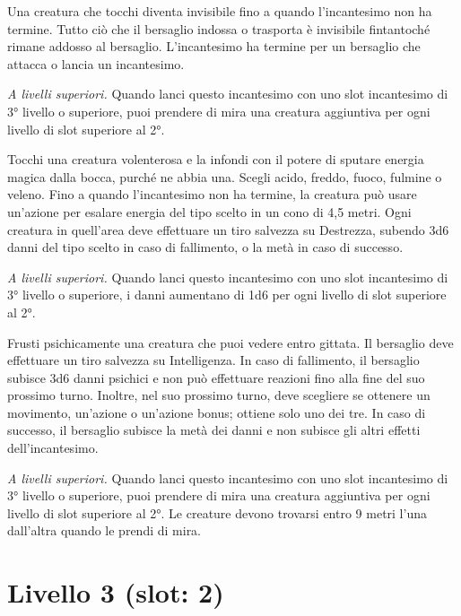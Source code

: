 \documentclass[letterpaper,twocolumn,openany,nodeprecatedcode,justified]{dndbook}
\begin{document}
Una creatura che tocchi diventa invisibile fino a quando l'incantesimo non ha termine. Tutto ciò che il bersaglio indossa o trasporta è invisibile fintantoché rimane addosso al bersaglio. L'incantesimo ha termine per un bersaglio che attacca o lancia un incantesimo.

\emph{A livelli superiori.} Quando lanci questo incantesimo con uno slot incantesimo di 3° livello o superiore, puoi prendere di mira una creatura aggiuntiva per ogni livello di slot superiore al 2°.


Tocchi una creatura volenterosa e la infondi con il potere di sputare energia magica dalla bocca, purché ne abbia una. Scegli acido, freddo, fuoco, fulmine o veleno. Fino a quando l'incantesimo non ha termine, la creatura può usare un'azione per esalare energia del tipo scelto in un cono di 4,5 metri. Ogni creatura in quell'area deve effettuare un tiro salvezza su Destrezza, subendo 3d6 danni del tipo scelto in caso di fallimento, o la metà in caso di successo.

\emph{A livelli superiori.} Quando lanci questo incantesimo con uno slot incantesimo di 3° livello o superiore, i danni aumentano di 1d6 per ogni livello di slot superiore al 2°.


Frusti psichicamente una creatura che puoi vedere entro gittata. Il bersaglio deve effettuare un tiro salvezza su Intelligenza. In caso di fallimento, il bersaglio subisce 3d6 danni psichici e non può effettuare reazioni fino alla fine del suo prossimo turno. Inoltre, nel suo prossimo turno, deve scegliere se ottenere un movimento, un'azione o un'azione bonus; ottiene solo uno dei tre. In caso di successo, il bersaglio subisce la metà dei danni e non subisce gli altri effetti dell'incantesimo.

\emph{A livelli superiori.} Quando lanci questo incantesimo con uno slot incantesimo di 3° livello o superiore, puoi prendere di mira una creatura aggiuntiva per ogni livello di slot superiore al 2°. Le creature devono trovarsi entro 9 metri l'una dall'altra quando le prendi di mira.

\section{Livello 3 (slot: 2)}
\end{document}
